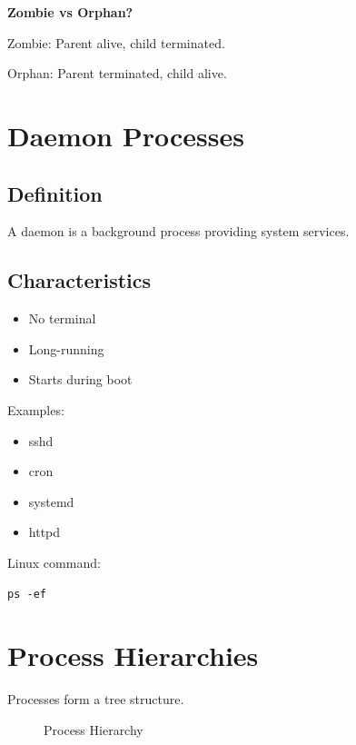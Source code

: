 \textbf{Zombie vs Orphan?}

Zombie:
Parent alive, child terminated.

Orphan:
Parent terminated, child alive.

\section{Daemon Processes}

\subsection{Definition}

A daemon is a background process providing system services.

\subsection{Characteristics}

\begin{itemize}
\item No terminal
\item Long-running
\item Starts during boot
\end{itemize}

Examples:

\begin{itemize}
\item sshd
\item cron
\item systemd
\item httpd
\end{itemize}

Linux command:

\begin{verbatim}
ps -ef
\end{verbatim}

\section{Process Hierarchies}

Processes form a tree structure.

\begin{figure}[H]
\centering
{}
\caption{Process Hierarchy}
\end{figure}

